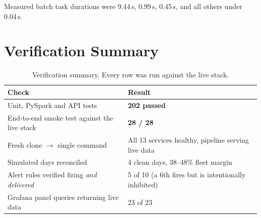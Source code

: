 Measured batch task durations were 
9.44\,s,  0.99\,s,
 0.45\,s, and all others under 0.04\,s.

\section{Verification Summary}
\label{sec:verification}

\begin{table}[htbp]
\centering
\caption{Verification summary. Every row was run against the live stack.}
\label{tab:verification}
\begin{tabularx}{\textwidth}{@{}XX@{}}
\toprule
\textbf{Check} & \textbf{Result}\\
\midrule
Unit, PySpark and API tests & \textbf{202 passed}\\
End-to-end smoke test against the live stack & \textbf{28 / 28}\\
Fresh clone $\rightarrow$ single command &
  All 13 services healthy, pipeline serving live data\\
Simulated days reconciled & 4 clean days, 38--48\% fleet margin\\
Alert rules verified firing \emph{and delivered} &
  5 of 10 (a 6th fires but is intentionally inhibited)\\
Grafana panel queries returning live data & 23 of 23\\
\bottomrule
\end{tabularx}
\end{table}

